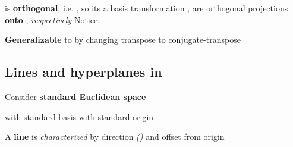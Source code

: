 \begin{itemize}
            \begin{itemize}

                  \vItem
                         is \textbf{orthogonal}, i.e. , so
                        its a basis transformation
                  \vItem
                        ,
                        are \ul{orthogonal projections} \textbf{onto} ,
                         \emph{respectively}
                  \vItem
                        Notice:
            \end{itemize}
      \vItem
            \textbf{Generalizable} to  by
            changing transpose to conjugate-transpose
\end{itemize}

\subsection*{\texorpdfstring{Lines and hyperplanes in }{Lines and hyperplanes in}}

Consider \textbf{standard Euclidean space}

\begin{itemize}

      \vItem
            with standard basis
      \vItem
            with standard origin 
\end{itemize}

\hSep %

A \textbf{line}  is
\emph{characterized} by direction 
\emph{()} and offset from origin 

